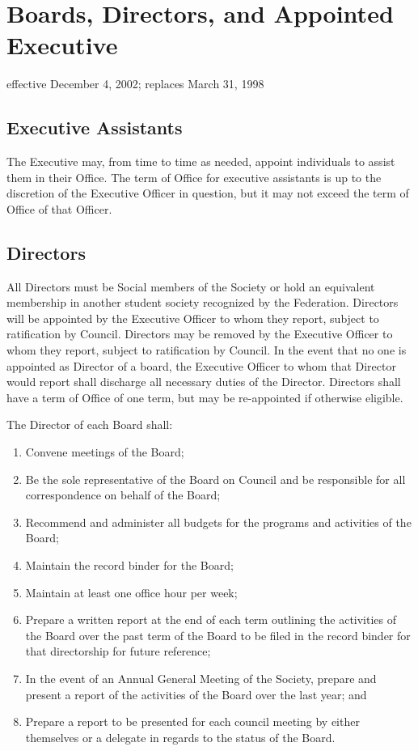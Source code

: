 \section{Boards, Directors, and Appointed Executive}
effective December 4, 2002; replaces March 31, 1998

\subsection{Executive Assistants}
The Executive may, from time to time as needed, appoint individuals to assist them in their Office.
The term of Office for executive assistants is up to the discretion of the Executive Officer in question, but it may not exceed the term of Office of that Officer.

\subsection{Directors}
All Directors must be Social members of the Society or hold an equivalent membership in another student society recognized by the Federation.
Directors will be appointed by the Executive Officer to whom they report, subject to ratification by Council.
Directors may be removed by the Executive Officer to whom they report, subject to ratification by Council.
In the event that no one is appointed as Director of a board, the Executive Officer to whom that Director would report shall discharge all necessary duties of the Director.
Directors shall have a term of Office of one term, but may be re-appointed if otherwise eligible.

The Director of each Board shall:
\begin{enumerate}
\item Convene meetings of the Board;
\item Be the sole representative of the Board on Council and be responsible for all correspondence on behalf of the Board;
\item Recommend and administer all budgets for the programs and activities of the Board;
\item Maintain the record binder for the Board;
\item Maintain at least one office hour per week;
\item Prepare a written report at the end of each term outlining the activities of the Board over the past term of the Board to be filed in the record binder for that directorship for future reference;
\item In the event of an Annual General Meeting of the Society, prepare and present a report of the activities of the Board over the last year; and
\item Prepare a report to be presented for each council meeting by either themselves or a delegate in regards to the status of the Board.
\end{enumerate}
